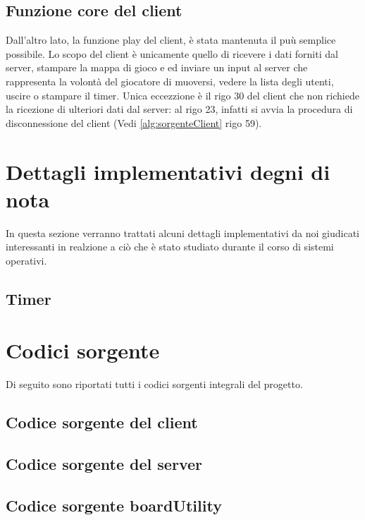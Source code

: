 \documentclass[a4paper]{article}
\begin{document}
\subsection{Funzione core del client}
Dall'altro lato, la funzione play del client, è stata mantenuta il puù semplice possibile.
Lo scopo del client è unicamente quello di ricevere i dati forniti dal server, stampare la mappa di gioco e ed inviare un input al server che rappresenta la volontà del giocatore di muoversi, vedere la lista degli utenti, uscire o stampare il timer.
Unica eccezzione è il rigo 30  del client che non richiede la ricezione di ulteriori dati dal server: al rigo 23, infatti si avvia la procedura di disconnessione del client (Vedi \autoref{alg:sorgenteClient} rigo 59).
\pagebreak


\pagebreak

\pagebreak
\section{Dettagli implementativi degni di nota}
In questa sezione verranno trattati alcuni dettagli implementativi da noi giudicati interessanti in realzione a ciò che è stato studiato durante il corso di sistemi operativi.
\subsection{Timer}

\appendix
\section{Codici sorgente}
Di seguito sono riportati tutti i codici sorgenti integrali del progetto.
\subsection{Codice sorgente del client}

\subsection{Codice sorgente del server}

\subsection{Codice sorgente boardUtility}


\end{document}
